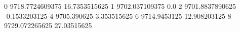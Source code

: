 0 9718.7724609375 16.7353515625
1 9702.037109375 0.0
2 9701.8837890625 -0.1533203125
4 9705.390625 3.353515625
6 9714.9453125 12.908203125
8 9729.072265625 27.03515625
